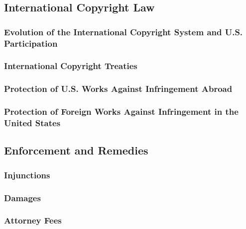 
\subsection{International Copyright Law}

\subsubsection{Evolution of the International Copyright System and U.S. 
Participation}


\subsubsection{International Copyright Treaties}


\subsubsection{Protection of U.S. Works Against Infringement Abroad}


\subsubsection{Protection of Foreign Works Against Infringement in the United 
States}


\subsection{Enforcement and Remedies}

\subsubsection{Injunctions}


\subsubsection{Damages}


\subsubsection{Attorney Fees}

